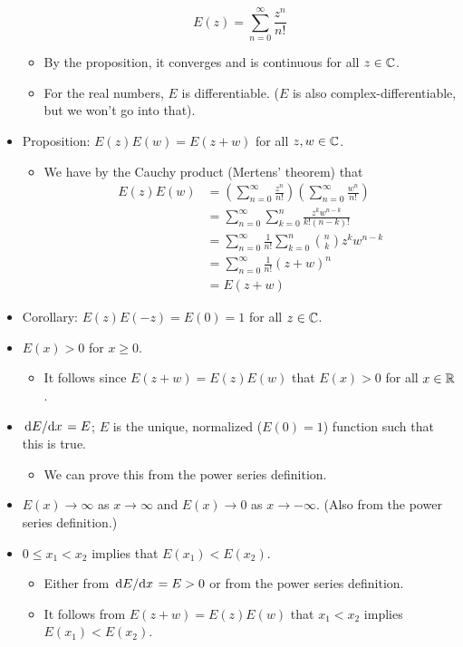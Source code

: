 \documentclass[../notes.tex]{subfiles}
\begin{document}
\begin{itemize}
    \begin{equation*}
        E(z) = \sum_{n=0}^\infty\frac{z^n}{n!}
    \end{equation*}
    \begin{itemize}
        \item By the proposition, it converges and is continuous for all $z\in\mathbb{C}$.
        \item For the real numbers, $E$ is differentiable. ($E$ is also complex-differentiable, but we won't go into that).
    \end{itemize}
    \item Proposition: $E(z)E(w)=E(z+w)$ for all $z,w\in\mathbb{C}$.
    \begin{itemize}
        \item We have by the Cauchy product (Mertens' theorem) that
        \begin{align*}
            E(z)E(w) &= \left( \sum_{n=0}^\infty\frac{z^n}{n!} \right)\left( \sum_{n=0}^\infty\frac{w^n}{n!} \right)\\
            &= \sum_{n=0}^\infty\sum_{k=0}^n\frac{z^kw^{n-k}}{k!(n-k)!}\\
            &= \sum_{n=0}^\infty\frac{1}{n!}\sum_{k=0}^n\binom{n}{k}z^kw^{n-k}\\
            &= \sum_{n=0}^\infty\frac{1}{n!}(z+w)^n\\
            &= E(z+w)
        \end{align*}
    \end{itemize}
    \item Corollary: $E(z)E(-z)=E(0)=1$ for all $z\in\mathbb{C}$.
    \item $E(x)>0$ for $x\geq 0$.
    \begin{itemize}
        \item It follows since $E(z+w)=E(z)E(w)$ that $E(x)>0$ for all $x\in\mathbb{R}$.
    \end{itemize}
    \item $\dv*{E}{x}=E$; $E$ is the unique, normalized ($E(0)=1$) function such that this is true.
    \begin{itemize}
        \item We can prove this from the power series definition.
    \end{itemize}
    \item $E(x)\to\infty$ as $x\to\infty$ and $E(x)\to 0$ as $x\to -\infty$. (Also from the power series definition.)
    \item $0\leq x_1<x_2$ implies that $E(x_1)<E(x_2)$.
    \begin{itemize}
        \item Either from $\dv*{E}{x}=E>0$ or from the power series definition.
        \item It follows from $E(z+w)=E(z)E(w)$ that $x_1<x_2$ implies $E(x_1)<E(x_2)$.
    \end{itemize}
\end{itemize}
\end{document}
